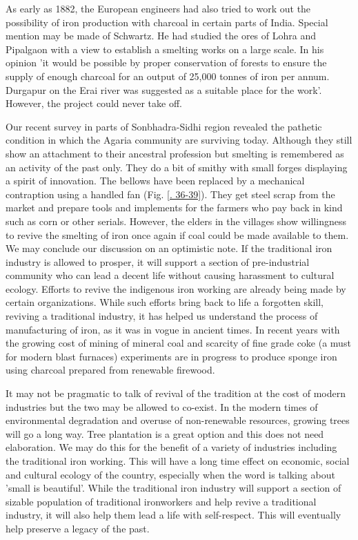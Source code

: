 As early as 1882, the European engineers had also tried to work out the possibility of iron production with charcoal in certain parts of India. Special mention may be made of Schwartz. He had studied the ores of Lohra and Pipalgaon with a view to establish a smelting works on a large scale. In his opinion 'it would be possible by proper conservation of forests to ensure the supply of enough charcoal for an output of 25,000 tonnes of iron per annum. Durgapur on the Erai river was suggested as a suitable place for the work'. However, the project could never take off. 

Our recent survey in parts of Sonbhadra-Sidhi region revealed the pathetic condition in which the Agaria community are surviving today. Although they still show an attachment to their ancestral profession but smelting is remembered as an activity of the past only. They do a bit of smithy with small forges displaying a spirit of innovation. The bellows have been replaced by a mechanical contraption using a handled fan (Fig. \ref{. 36-39}). They get steel scrap from the market and prepare tools and implements for the farmers who pay back in kind such as corn or other serials. However, the elders in the villages show willingness to revive the smelting of iron once again if coal could be made available to them. We may conclude our discussion on an optimistic note. If the traditional iron industry is allowed to prosper, it will support a section of pre-industrial community who can lead a decent life without causing harassment to cultural ecology. Efforts to revive the indigenous iron working are already being made by certain organizations. While such efforts bring back to life a forgotten skill, reviving a traditional industry, it has helped us understand the process of manufacturing of iron, as it was in vogue in ancient times. In recent years with the growing cost of mining of mineral coal and scarcity of fine grade coke (a must for modern blast furnaces) experiments are in progress to produce sponge iron using charcoal prepared from renewable firewood. 

It may not be pragmatic to talk of revival of the tradition at the cost of modern industries but the two may be allowed to co-exist. In the modern times of environmental degradation and overuse of non-renewable resources, growing trees will go a long way. Tree plantation is a great option and this does not need elaboration. We may do this for the benefit of a variety of industries including the traditional iron working. This will have a long time effect on economic, social and cultural ecology of the country, especially when the word is talking about 'small is beautiful'. While the traditional iron industry will support a section of sizable population of traditional ironworkers and help revive a traditional industry, it will also help them lead a life with self-respect. This will eventually help preserve a legacy of the past.

